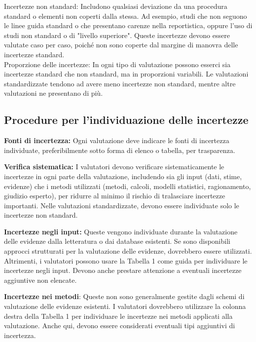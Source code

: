 Incertezze non standard: Includono qualsiasi deviazione da una procedura standard o elementi non coperti dalla stessa. Ad esempio, studi che non seguono le linee guida standard o che presentano carenze nella reportistica, oppure l'uso di studi non standard o di "livello superiore". Queste incertezze devono essere valutate caso per caso, poiché non sono coperte dal margine di manovra delle incertezze standard.\\

Proporzione delle incertezze: In ogni tipo di valutazione possono esserci sia incertezze standard che non standard, ma in proporzioni variabili. Le valutazioni standardizzate tendono ad avere meno incertezze non standard, mentre altre valutazioni ne presentano di più.



\subsection{Procedure per l'individuazione delle incertezze} 

\textbf{Fonti di incertezza:} Ogni valutazione deve indicare le fonti di incertezza individuate, preferibilmente sotto forma di elenco o tabella, per trasparenza.

\textbf{Verifica sistematica:} I valutatori devono verificare sistematicamente le incertezze in ogni parte della valutazione, includendo sia gli input (dati, stime, evidenze) che i metodi utilizzati (metodi, calcoli, modelli statistici, ragionamento, giudizio esperto), per ridurre al minimo il rischio di tralasciare incertezze importanti. Nelle valutazioni standardizzate, devono essere individuate solo le incertezze non standard.

\textbf{Incertezze negli input:} Queste vengono individuate durante la valutazione delle evidenze dalla letteratura o dai database esistenti. Se sono disponibili approcci strutturati per la valutazione delle evidenze, dovrebbero essere utilizzati. Altrimenti, i valutatori possono usare la Tabella 1 come guida per individuare le incertezze negli input. Devono anche prestare attenzione a eventuali incertezze aggiuntive non elencate.

\textbf{Incertezze nei metodi}: Queste non sono generalmente gestite dagli schemi di valutazione delle evidenze esistenti. I valutatori dovrebbero utilizzare la colonna destra della Tabella 1 per individuare le incertezze nei metodi applicati alla valutazione. Anche qui, devono essere considerati eventuali tipi aggiuntivi di incertezza.

